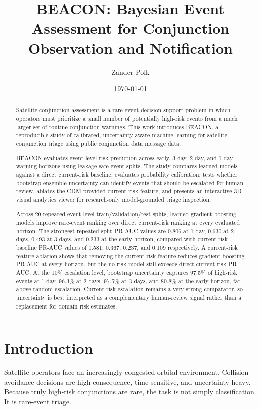 \documentclass[11pt]{article}
\title{BEACON: Bayesian Event Assessment for Conjunction Observation and Notification}
\author{Zander Polk}
\date{\today}
\begin{document}
\maketitle

\begin{abstract}
Satellite conjunction assessment is a rare-event decision-support problem in which operators must prioritize a small number of potentially high-risk events from a much larger set of routine conjunction warnings. This work introduces BEACON, a reproducible study of calibrated, uncertainty-aware machine learning for satellite conjunction triage using public conjunction data message data.

BEACON evaluates event-level risk prediction across early, 3-day, 2-day, and 1-day warning horizons using leakage-safe event splits. The study compares learned models against a direct current-risk baseline, evaluates probability calibration, tests whether bootstrap ensemble uncertainty can identify events that should be escalated for human review, ablates the CDM-provided current risk feature, and presents an interactive 3D visual analytics viewer for research-only model-grounded triage inspection.

Across 20 repeated event-level train/validation/test splits, learned gradient boosting models improve rare-event ranking over direct current-risk ranking at every evaluated horizon. The strongest repeated-split PR-AUC values are 0.806 at 1 day, 0.630 at 2 days, 0.493 at 3 days, and 0.233 at the early horizon, compared with current-risk baseline PR-AUC values of 0.581, 0.367, 0.237, and 0.109 respectively. A current-risk feature ablation shows that removing the current risk feature reduces gradient-boosting PR-AUC at every horizon, but the no-risk model still exceeds direct current-risk PR-AUC. At the 10\% escalation level, bootstrap uncertainty captures 97.5\% of high-risk events at 1 day, 96.3\% at 2 days, 97.5\% at 3 days, and 80.8\% at the early horizon, far above random escalation. Current-risk escalation remains a very strong comparator, so uncertainty is best interpreted as a complementary human-review signal rather than a replacement for domain risk estimates.
\end{abstract}

\section{Introduction}

Satellite operators face an increasingly congested orbital environment. Collision avoidance decisions are high-consequence, time-sensitive, and uncertainty-heavy. Because truly high-risk conjunctions are rare, the task is not simply classification. It is rare-event triage.
\end{document}
